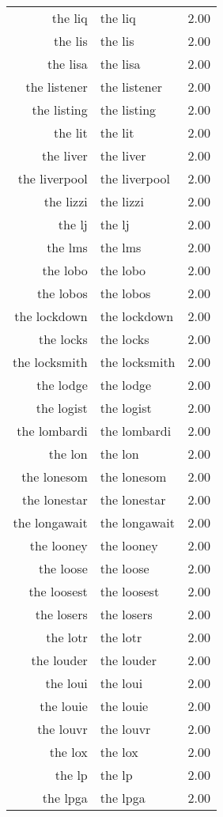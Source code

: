\begin{table}[ht]
\begin{tabular}{rlr}
  the liq & the liq & 2.00 \\ 
  the lis & the lis & 2.00 \\ 
  the lisa & the lisa & 2.00 \\ 
  the listener & the listener & 2.00 \\ 
  the listing & the listing & 2.00 \\ 
  the lit & the lit & 2.00 \\ 
  the liver & the liver & 2.00 \\ 
  the liverpool & the liverpool & 2.00 \\ 
  the lizzi & the lizzi & 2.00 \\ 
  the lj & the lj & 2.00 \\ 
  the lms & the lms & 2.00 \\ 
  the lobo & the lobo & 2.00 \\ 
  the lobos & the lobos & 2.00 \\ 
  the lockdown & the lockdown & 2.00 \\ 
  the locks & the locks & 2.00 \\ 
  the locksmith & the locksmith & 2.00 \\ 
  the lodge & the lodge & 2.00 \\ 
  the logist & the logist & 2.00 \\ 
  the lombardi & the lombardi & 2.00 \\ 
  the lon & the lon & 2.00 \\ 
  the lonesom & the lonesom & 2.00 \\ 
  the lonestar & the lonestar & 2.00 \\ 
  the longawait & the longawait & 2.00 \\ 
  the looney & the looney & 2.00 \\ 
  the loose & the loose & 2.00 \\ 
  the loosest & the loosest & 2.00 \\ 
  the losers & the losers & 2.00 \\ 
  the lotr & the lotr & 2.00 \\ 
  the louder & the louder & 2.00 \\ 
  the loui & the loui & 2.00 \\ 
  the louie & the louie & 2.00 \\ 
  the louvr & the louvr & 2.00 \\ 
  the lox & the lox & 2.00 \\ 
  the lp & the lp & 2.00 \\ 
  the lpga & the lpga & 2.00 \\ 

\end{tabular}
\end{table}
